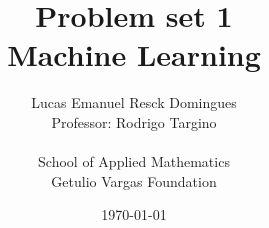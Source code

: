 \documentclass{article}
\title{Problem set 1\\
    \large{Machine Learning}}
\author{Lucas Emanuel Resck Domingues\\    
    Professor: Rodrigo Targino\\\\
    {School of Applied Mathematics}\\
    {Getulio Vargas Foundation}}
\date{\today}
\begin{document}
    \maketitle

    \nocite{yaser2012learning}
    
    
\end{document}
